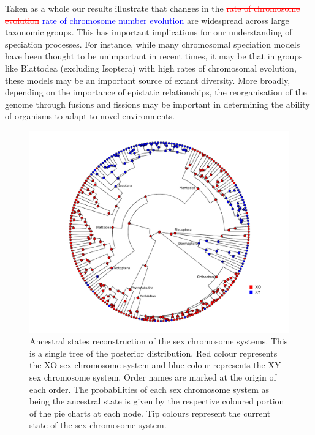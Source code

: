 \documentclass[]{rsos}%
\begin{document}
Taken as a whole our results illustrate that changes in the \textcolor{red}{\st{rate of chromosome evolution}} \textcolor{blue}{rate of chromosome number evolution} are widespread across large taxonomic groups.
This has important implications for our understanding of speciation processes.
For instance, while many chromosomal speciation models \cite{baker1986, white} have been thought to be unimportant in recent times, it may be that in groups like Blattodea (excluding Isoptera) with high rates of chromosomal evolution, these models may be an important source of extant diversity.
More broadly, depending on the importance of epistatic relationships, the reorganisation of the genome through fusions and fissions may be important in determining the ability of organisms to adapt to novel environments.

\newpage
\begin{figure}[h!]
\centering \includegraphics[width=1\textwidth]{sex_asr_plot.pdf}
\caption{Ancestral states reconstruction of the sex chromosome systems. 
This is a single tree of the posterior distribution. 
Red colour represents the XO sex chromosome system and blue colour represents the XY sex chromosome system. Order names are marked at the origin of each order. 
The probabilities of each sex chromosome system as being the ancestral state is given by the respective coloured portion of the pie charts at each node. 
Tip colours represent the current state of the sex chromosome system.}
\label{fig:sex.asr.plot}
\end{figure}
\end{document}
